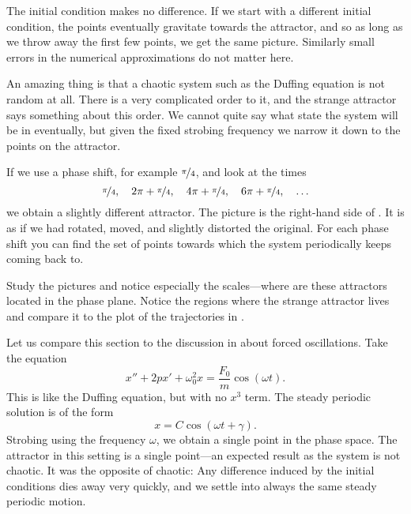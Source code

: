 \documentclass{ximera}
\begin{document}
The initial condition makes no difference. If we start with a different initial condition, the points eventually gravitate towards the attractor, and so as long as we throw away the first few points, we get the same picture. Similarly small errors in the numerical approximations do not matter here.
 
An amazing thing is that a chaotic system such as the Duffing equation is not random at all.  There is a very complicated order to it, and the strange attractor says something about this order.  We cannot quite say what state the system will be in eventually, but given the fixed strobing frequency we narrow it down to the points on the attractor.

If we use a phase shift, for example $\nicefrac{\pi}{4}$, and look at the times
\begin{equation*}
    \nicefrac{\pi}{4}, \quad 2\pi+\nicefrac{\pi}{4}, \quad 4\pi+\nicefrac{\pi}{4}, \quad 6\pi+\nicefrac{\pi}{4}, \quad \ldots
\end{equation*}
we obtain a slightly different attractor. The picture is the right-hand side of  . It is as if we had rotated, moved, and slightly distorted the original. For each phase shift you can find the set of points towards which the system periodically keeps coming back to.

Study the pictures and notice especially the scales---where are these attractors located in the phase plane.  Notice the regions where the strange attractor lives and compare it to the plot of the trajectories in .

Let us compare this section to the discussion in  about forced oscillations.  Take the equation
\begin{equation*}
    x''+2p x' + \omega_0^2 x = \frac{F_0}{m} \cos (\omega t) .
\end{equation*}
This is like the Duffing equation, but with no $x^3$ term. The steady periodic solution is of the form
\begin{equation*}
    x = C \cos (\omega t + \gamma) .
\end{equation*}
Strobing using the frequency $\omega$, we obtain a single point in the phase space.  The attractor in this setting is a single point---an expected result as the system is not chaotic.  It was the opposite of chaotic:  Any difference induced by the initial conditions dies away very quickly, and we settle into always the same steady periodic motion.
\end{document}
